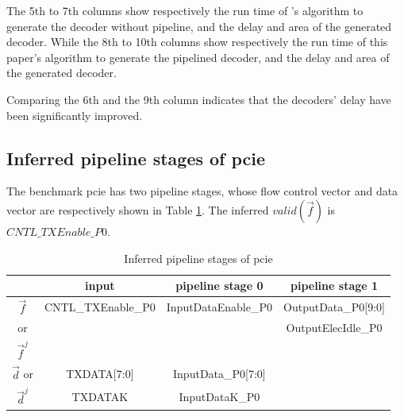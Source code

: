 \documentclass[conference]{IEEEtran}
\begin{document}
The 5th to 7th columns show respectively the run time of \cite{ShenTCAD11}'s algorithm to generate the decoder without pipeline,
and the delay and area of the generated decoder.
While the 8th to 10th columns show respectively the run time of this paper's algorithm to generate the pipelined decoder,
and the delay and area of the generated decoder.

Comparing the 6th and the 9th column indicates that
the decoders' delay have been significantly improved.


\subsection{Inferred pipeline stages of pcie}

The benchmark pcie has two pipeline stages,
whose flow control vector and data vector are respectively shown in Table \ref{tab_pcie}.
The inferred $valid(\vec{f})$ is $CNTL\_TXEnable\_P0$.

\begin{table}[t]
\centering
\caption{Inferred pipeline stages of pcie}
\begin{tabular}{|c|c|c|c|}
\hline
                       & input                  & pipeline stage 0          &  pipeline stage 1    \\\hline\hline
$\vec{f}$              &CNTL\_TXEnable\_P0      & InputDataEnable\_P0       & OutputData\_P0[9:0]\\
or                     &                        &                           & OutputElecIdle\_P0 \\
$\vec{f}^j$            &                        &                           &  \\\hline
$\vec{d}$ or           &TXDATA[7:0]             & InputData\_P0[7:0]        & \\
$\vec{d}^j$              &TXDATAK                 & InputDataK\_P0            & \\\hline
\end{tabular}\label{tab_pcie}
\end{table}
\end{document}

